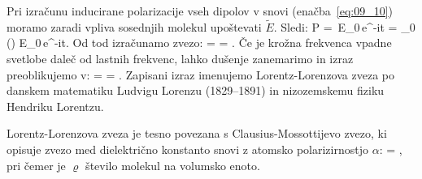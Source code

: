 Pri izračunu inducirane polarizacije vseh dipolov v snovi (enačba~\ref{eq:09_10}) 
moramo zaradi vpliva sosednjih molekul upoštevati $\tilde{E}$. Sledi:
\beq
P = 
\,E_0\,e^{-i\omega t}
= \varepsilon_0 () E_0\,e^{-i\omega t}.
\label{eq:09_33}
\eeq
Od tod izračunamo zvezo:
\beq
{} =  = 
.
\label{eq:09_34}
\eeq
Če je krožna frekvenca vpadne svetlobe daleč od lastnih frekvenc, lahko dušenje zanemarimo in 
izraz preoblikujemo v:
\beq
{} =  = 
.
\label{eq:09_35}
\eeq
Zapisani izraz imenujemo Lorentz-Lorenzova zveza po danskem matematiku Ludvigu Lorenzu 
(1829--1891) in nizozemskemu fiziku Hendriku Lorentzu. 
\begin{remark}
 Lorentz-Lorenzova zveza je tesno povezana s Clausius-Mossottijevo zvezo, ki opisuje
 zvezo med dielektrično konstanto snovi z atomsko polarizirnostjo $\alpha$:
 \beq
{} = ,
\label{eq:09_35a}
\eeq
pri čemer je $\varrho$ število molekul na volumsko enoto. 
\end{remark}

